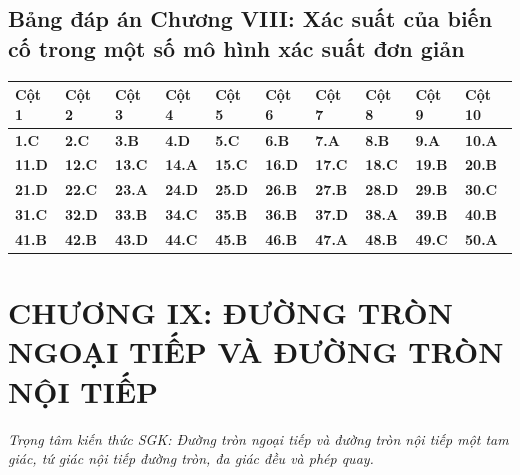 \documentclass[11pt,a4paper]{article}
\begin{document}
\subsection*{\color{primary} Bảng đáp án Chương VIII: Xác suất của biến cố trong một số mô hình xác suất đơn giản}
\begin{center}
\renewcommand{\arraystretch}{1.25}
\begin{tabularx}{\textwidth}{*{10}{>{\centering\arraybackslash}X}}
\toprule
\textbf{\color{primary} Cột 1} & \textbf{\color{primary} Cột 2} & \textbf{\color{primary} Cột 3} & \textbf{\color{primary} Cột 4} & \textbf{\color{primary} Cột 5} & \textbf{\color{primary} Cột 6} & \textbf{\color{primary} Cột 7} & \textbf{\color{primary} Cột 8} & \textbf{\color{primary} Cột 9} & \textbf{\color{primary} Cột 10} \\
\midrule
\textbf{1.C} & \textbf{2.C} & \textbf{3.B} & \textbf{4.D} & \textbf{5.C} & \textbf{6.B} & \textbf{7.A} & \textbf{8.B} & \textbf{9.A} & \textbf{10.A} \\
\rowcolor{rowtint} \textbf{11.D} & \textbf{12.C} & \textbf{13.C} & \textbf{14.A} & \textbf{15.C} & \textbf{16.D} & \textbf{17.C} & \textbf{18.C} & \textbf{19.B} & \textbf{20.B} \\
\textbf{21.D} & \textbf{22.C} & \textbf{23.A} & \textbf{24.D} & \textbf{25.D} & \textbf{26.B} & \textbf{27.B} & \textbf{28.D} & \textbf{29.B} & \textbf{30.C} \\
\rowcolor{rowtint} \textbf{31.C} & \textbf{32.D} & \textbf{33.B} & \textbf{34.C} & \textbf{35.B} & \textbf{36.B} & \textbf{37.D} & \textbf{38.A} & \textbf{39.B} & \textbf{40.B} \\
\textbf{41.B} & \textbf{42.B} & \textbf{43.D} & \textbf{44.C} & \textbf{45.B} & \textbf{46.B} & \textbf{47.A} & \textbf{48.B} & \textbf{49.C} & \textbf{50.A} \\
\bottomrule
\end{tabularx}
\end{center}\vspace{10pt}
\section*{\color{primary} CHƯƠNG IX: ĐƯỜNG TRÒN NGOẠI TIẾP VÀ ĐƯỜNG TRÒN NỘI TIẾP}
\textit{Trọng tâm kiến thức SGK: Đường tròn ngoại tiếp và đường tròn nội tiếp một tam giác, tứ giác nội tiếp đường tròn, đa giác đều và phép quay.}\par\vspace{4pt}
\end{document}
